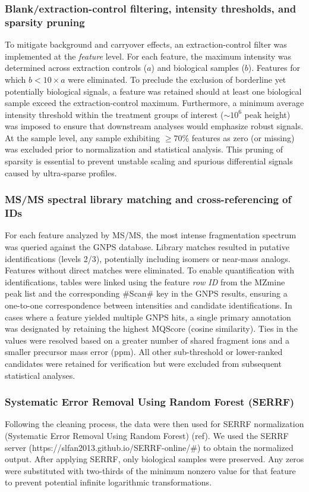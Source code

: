 \documentclass[10pt,letterpaper]{article}
\begin{document}
\subsubsection*{Blank/extraction-control filtering, intensity thresholds, and sparsity pruning}
To mitigate background and carryover effects, an extraction-control filter was implemented at the \emph{feature} level. For each feature, the maximum intensity was determined across extraction controls (\(a\)) and biological samples (\(b\)). Features for which \(b < 10\times a\) were eliminated. To preclude the exclusion of borderline yet potentially biological signals, a feature was retained should at least one biological sample exceed the extraction-control maximum. Furthermore, a minimum average intensity threshold within the treatment groups of interest (\(\sim 10^{6}\) peak height) was imposed to ensure that downstream analyses would emphasize robust signals. At the sample level, any sample exhibiting \(\geq 70\%\) features as zero (or missing) was excluded prior to normalization and statistical analysis. This pruning of sparsity is essential to prevent unstable scaling and spurious differential signals caused by ultra-sparse profiles. 


\subsubsection*{MS/MS spectral library matching and cross-referencing of IDs}
For each feature analyzed by MS/MS, the most intense fragmentation spectrum was queried against the GNPS database. Library matches resulted in putative identifications (levels 2/3), potentially including isomers or near-mass analogs. Features without direct matches were eliminated. To enable quantification with identifications, tables were linked using the feature \emph{row ID} from the MZmine peak list and the corresponding \#Scan\# key in the GNPS results, ensuring a one-to-one correspondence between intensities and candidate identifications. In cases where a feature yielded multiple GNPS hits, a single primary annotation was designated by retaining the highest MQScore (cosine similarity). Ties in the values were resolved based on a greater number of shared fragment ions and a smaller precursor mass error (ppm). All other sub-threshold or lower-ranked candidates were retained for verification but were excluded from subsequent statistical analyses.

\subsubsection*{Systematic Error Removal Using Random Forest (SERRF)}
Following the cleaning process, the data were then used for SERRF normalization (Systematic Error Removal Using Random Forest) (ref). We used the SERRF server (https://slfan2013.github.io/SERRF-online/\#) to obtain the normalized output. After applying SERRF, only biological samples were preserved. Any zeros were substituted with two-thirds of the minimum nonzero value for that feature to prevent potential infinite logarithmic transformations.
\end{document}
